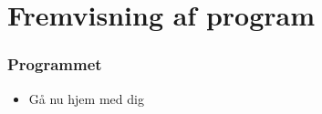 \section{Fremvisning af program}
\begin{frame}
  \frametitle{Programmet}
  \begin{itemize}
    \item Gå nu hjem med dig
  \end{itemize}
\end{frame}
